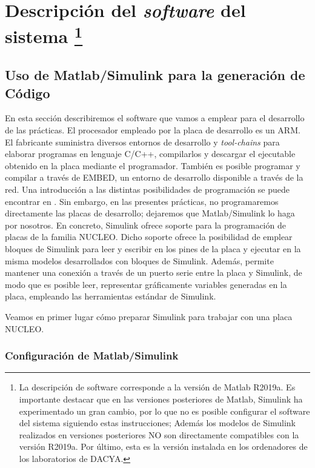 \documentclass[10pt,a4paper]{report}
\begin{document}
\chapter{Descripción del \emph{software} del sistema \protect \footnote{La descripción de software corresponde a la versión de Matlab R2019a.  Es importante destacar que en las versiones posteriores de Matlab, Simulink ha experimentado un gran cambio, por lo que no es posible configurar el software del sistema siguiendo estas instrucciones; Además los modelos de Simulink realizados en versiones posteriores NO son directamente compatibles con la versión R2019a. Por último, esta es la versión instalada en los ordenadores de los laboratorios de DACYA.}}
\section{Uso de Matlab/Simulink para la generación de Código}
En esta sección describiremos el software que vamos a emplear para el desarrollo de  las prácticas. El procesador empleado por la placa de desarrollo es un ARM. El fabricante suministra diversos entornos de desarrollo y \emph{tool-chains} para elaborar programas en lenguaje C/C++, compilarlos y descargar el ejecutable obtenido en la placa mediante el programador. También es posible programar y compilar a través de EMBED, un entorno de desarrollo disponible a través de la red. Una introducción a las distintas posibilidades de programación se puede encontrar en \cite{STNUCLEOSF}.
Sin embargo, en las presentes prácticas, no programaremos directamente las placas de desarrollo; dejaremos que Matlab/Simulink lo haga por nosotros. En concreto, Simulink ofrece soporte para la programación de placas de la familia NUCLEO.  Dicho soporte ofrece la posibilidad de emplear bloques de Simulink para leer y escribir en los pines de la placa y ejecutar en la misma modelos desarrollados con bloques de Simulink. Además, permite mantener una conexión a través de un puerto serie entre la placa y Simulink, de modo que es posible leer, representar gráficamente variables generadas en la placa, empleando las herramientas estándar de Simulink.

Veamos en primer lugar cómo preparar Simulink para trabajar con una placa NUCLEO.
\subsection{Configuración de Matlab/Simulink}
\end{document}
